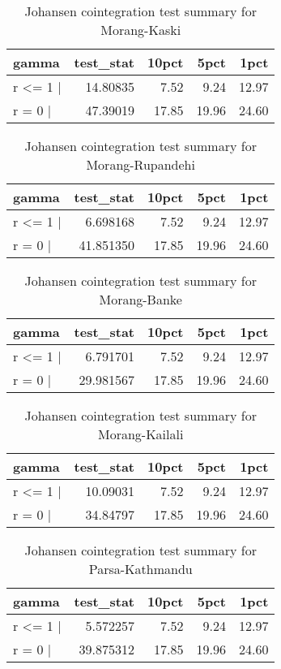 \documentclass[12pt,]{article}
\begin{document}
\begin{longtable}[t]{lrrrr}
\caption{\label{tab:wheat-cajo-test}Johansen cointegration test summary for Morang-Kaski}\\
\toprule
gamma & test\_stat & 10pct & 5pct & 1pct\\
\midrule
r <= 1 | & 14.80835 & 7.52 & 9.24 & 12.97\\
r = 0  | & 47.39019 & 17.85 & 19.96 & 24.60\\
\bottomrule
\end{longtable}

\begin{longtable}[t]{lrrrr}
\caption{\label{tab:wheat-cajo-test}Johansen cointegration test summary for Morang-Rupandehi}\\
\toprule
gamma & test\_stat & 10pct & 5pct & 1pct\\
\midrule
r <= 1 | & 6.698168 & 7.52 & 9.24 & 12.97\\
r = 0  | & 41.851350 & 17.85 & 19.96 & 24.60\\
\bottomrule
\end{longtable}

\begin{longtable}[t]{lrrrr}
\caption{\label{tab:wheat-cajo-test}Johansen cointegration test summary for Morang-Banke}\\
\toprule
gamma & test\_stat & 10pct & 5pct & 1pct\\
\midrule
r <= 1 | & 6.791701 & 7.52 & 9.24 & 12.97\\
r = 0  | & 29.981567 & 17.85 & 19.96 & 24.60\\
\bottomrule
\end{longtable}

\begin{longtable}[t]{lrrrr}
\caption{\label{tab:wheat-cajo-test}Johansen cointegration test summary for Morang-Kailali}\\
\toprule
gamma & test\_stat & 10pct & 5pct & 1pct\\
\midrule
r <= 1 | & 10.09031 & 7.52 & 9.24 & 12.97\\
r = 0  | & 34.84797 & 17.85 & 19.96 & 24.60\\
\bottomrule
\end{longtable}

\begin{longtable}[t]{lrrrr}
\caption{\label{tab:wheat-cajo-test}Johansen cointegration test summary for Parsa-Kathmandu}\\
\toprule
gamma & test\_stat & 10pct & 5pct & 1pct\\
\midrule
r <= 1 | & 5.572257 & 7.52 & 9.24 & 12.97\\
r = 0  | & 39.875312 & 17.85 & 19.96 & 24.60\\
\bottomrule
\end{longtable}
\end{document}

